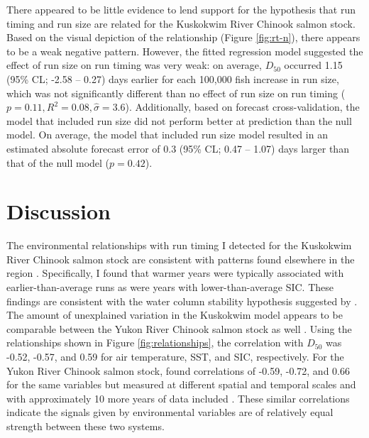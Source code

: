 \documentclass[12pt,]{book}
\theoremstyle{definition}
\theoremstyle{definition}
\theoremstyle{definition}
\theoremstyle{remark}
\begin{document}
\noindent
There appeared to be little evidence to lend support for the hypothesis
that run timing and run size are related for the Kuskokwim River Chinook
salmon stock. Based on the visual depiction of the relationship (Figure
\ref{fig:rt-n}), there appears to be a weak negative pattern. However,
the fitted regression model suggested the effect of run size on run
timing was very weak: on average, \(D_{50}\) occurred 1.15 (95\% CL;
-2.58 -- 0.27) days earlier for each 100,000 fish increase in run size,
which was not significantly different than no effect of run size on run
timing (\(p = 0.11, R^2 = 0.08, \hat{\sigma} = 3.6\)). Additionally,
based on forecast cross-validation, the model that included run size did
not perform better at prediction than the null model. On average, the
model that included run size model resulted in an estimated absolute
forecast error of 0.3 (95\% CL; 0.47 -- 1.07) days larger than that of
the null model (\(p = 0.42\)).

\section{Discussion}\label{discussion}

The environmental relationships with run timing I detected for the
Kuskokwim River Chinook salmon stock are consistent with patterns found
elsewhere in the region
\citep[e.g.,][]{mundy-evenson-2011, hodgson-etal-2006}. Specifically, I
found that warmer years were typically associated with
earlier-than-average runs as were years with lower-than-average SIC.
These findings are consistent with the water column stability hypothesis
suggested by \citet{mundy-evenson-2011}. The amount of unexplained
variation in the Kuskokwim model appears to be comparable between the
Yukon River Chinook salmon stock as well \citep{mundy-evenson-2011}.
Using the relationships shown in Figure \ref{fig:relationships}, the
correlation with \(D_{50}\) was -0.52, -0.57, and 0.59 for air
temperature, SST, and SIC, respectively. For the Yukon River Chinook
salmon stock, \citet{mundy-evenson-2011} found correlations of -0.59,
-0.72, and 0.66 for the same variables but measured at different spatial
and temporal scales and with approximately 10 more years of data
included \citep[Table 2 in][]{mundy-evenson-2011}. These similar
correlations indicate the signals given by environmental variables are
of relatively equal strength between these two systems.
\end{document}
